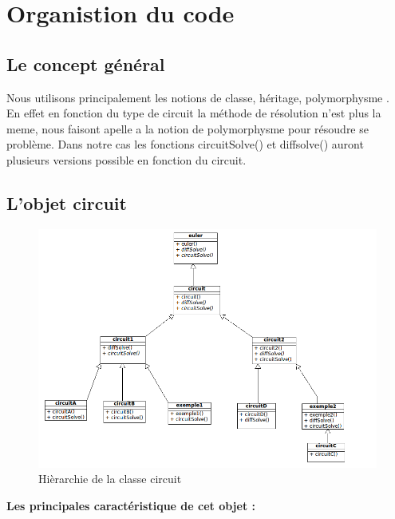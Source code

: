 \documentclass[a4paper,11pt]{article}
\begin{document}
\section{Organistion du code}
  \subsection{Le concept général}
  Nous utilisons principalement les notions de classe, héritage, polymorphysme .\\
  En effet en fonction du type de circuit la méthode de
  résolution n'est plus la meme, nous faisont apelle a la notion de polymorphysme pour résoudre se problème. Dans notre cas les fonctions 
  circuitSolve() et diffsolve() auront plusieurs versions possible en fonction du circuit.
  \subsection{L'objet circuit}
    \begin{figure}[H]
	 \begin{center}
	  \includegraphics[scale=.5]{circuitDiagram}
	\caption{Hièrarchie de la classe circuit}
	\end{center}
      \end{figure}
    \textbf{Les principales caractéristique de cet objet :}\\
\end{document}
